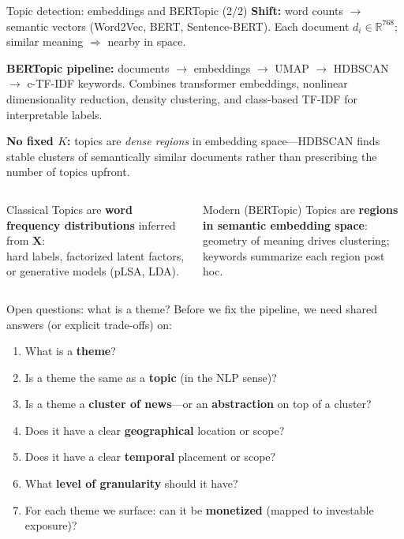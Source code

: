 \documentclass[10pt,aspectratio=169]{beamer}
\begin{document}
\begin{frame}[t]{Topic detection: embeddings and BERTopic (2/2)}
  \footnotesize
  \textbf{Shift:} word counts $\rightarrow$ semantic vectors (Word2Vec, BERT, Sentence-BERT).
  Each document $d_i \in \mathbb{R}^{768}$; similar meaning $\Rightarrow$ nearby in space.

  \vspace{0.25cm}
  \textbf{BERTopic pipeline:}
  documents $\rightarrow$ embeddings $\rightarrow$ UMAP $\rightarrow$ HDBSCAN $\rightarrow$ c-TF-IDF keywords.
  Combines transformer embeddings, nonlinear dimensionality reduction, density clustering, and class-based TF-IDF for interpretable labels.

  \vspace{0.25cm}
  \textbf{No fixed $K$:} topics are \emph{dense regions} in embedding space---HDBSCAN finds stable clusters of semantically similar documents rather than prescribing the number of topics upfront.


  \begin{columns}[T,onlytextwidth]
      \begin{block}{Classical}
        \footnotesize
        Topics are \textbf{word frequency distributions} inferred from $\mathbf{X}$:\\
        hard labels, factorized latent factors, or generative models (pLSA, LDA).
      \end{block}

      \begin{block}{Modern (BERTopic)}
        \footnotesize
        Topics are \textbf{regions in semantic embedding space}:\\
        geometry of meaning drives clustering; keywords summarize each region post hoc.
      \end{block}
  \end{columns}

\end{frame}

\begin{frame}[t]{Open questions: what is a theme?}
  \small
  Before we fix the pipeline, we need shared answers (or explicit trade-offs) on:

  \begin{enumerate}
    \item What is a \textbf{theme}?
    \item Is a theme the same as a \textbf{topic} (in the NLP sense)?
    \item Is a theme a \textbf{cluster of news}---or an \textbf{abstraction} on top of a cluster?
    \item Does it have a clear \textbf{geographical} location or scope?
    \item Does it have a clear \textbf{temporal} placement or scope?
    \item What \textbf{level of granularity} should it have?
    \item For each theme we surface: can it be \textbf{monetized} (mapped to investable exposure)?
  \end{enumerate}

\end{frame}
\end{document}
